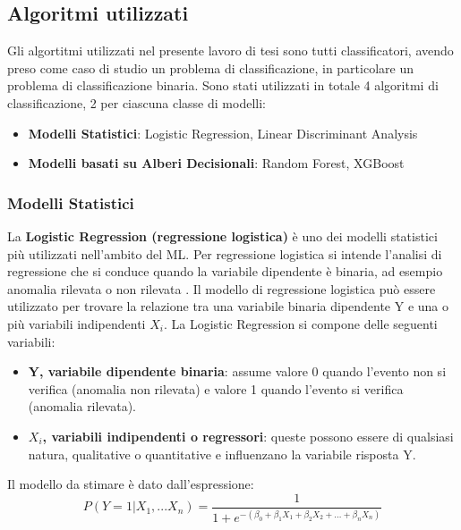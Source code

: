 \subsection{Algoritmi utilizzati}
Gli algortitmi utilizzati nel presente lavoro di tesi sono tutti classificatori, avendo preso come caso di studio un problema di classificazione, in particolare un problema di classificazione binaria. Sono stati utilizzati in totale 4 algoritmi di classificazione, 2 per ciascuna classe di modelli:

\begin{itemize}

  \item \textbf{Modelli Statistici}: Logistic Regression, Linear Discriminant Analysis
  
  \item \textbf{Modelli basati su Alberi Decisionali}: Random Forest, XGBoost
    
\end{itemize}


\subsubsection{Modelli Statistici}
La \textbf{Logistic Regression (regressione logistica)} \`e uno dei modelli statistici pi\`u utilizzati nell'ambito del ML. Per regressione logistica si intende l'analisi di regressione che si conduce quando la variabile dipendente \`e binaria, ad esempio anomalia rilevata o non rilevata \cite{lr_rf}. Il modello di regressione logistica pu\`o essere utilizzato per trovare la relazione tra una variabile binaria dipendente Y e una o pi\`u variabili indipendenti $X_{i}$. La Logistic Regression si compone delle seguenti variabili:
\begin{itemize}

  \item \textbf{Y, variabile dipendente binaria}: assume valore 0 quando l'evento non si verifica (anomalia non rilevata) e valore 1 quando l'evento si verifica (anomalia rilevata).
  
  \item \textbf{$X_{i}$, variabili indipendenti o regressori}: queste possono essere di qualsiasi natura, qualitative o quantitative e influenzano la variabile risposta Y.
    
\end{itemize}

\vspace{0.5cm}

Il modello da stimare \`e dato dall'espressione\cite{lr}:
\begin{equation}
P(Y=1 | X_1,...X_n) = \frac{1}{1 + e^{-(\beta_0 + \beta_1 X_1 + \beta_2 X_2 + \ldots + \beta_n X_n)}}
\end{equation}

